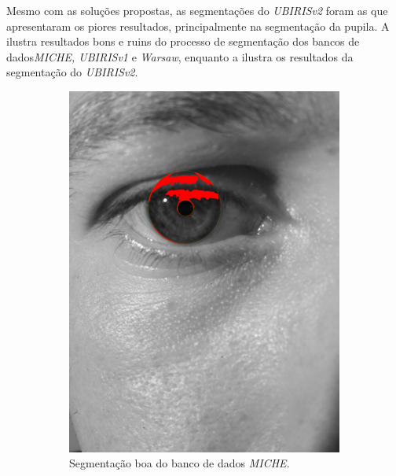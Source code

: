 \par Mesmo com as soluções propostas, as segmentações do \textit{UBIRISv2} foram as que apresentaram os piores resultados, principalmente na segmentação da pupila. A  ilustra resultados bons e ruins do processo de segmentação dos bancos de dados\textit{MICHE, UBIRISv1} e \textit{\acrshort{Warsaw}}, enquanto a  ilustra os resultados da segmentação do \textit{UBIRISv2}.

\begin{figure}[H]
    \centering %
\begin{subfigure}{0.25\textwidth}
  \includegraphics[width=\linewidth]{img/Resultados/miche/miche_seg_boa.jpg}
  \caption{Segmentação boa do banco de dados \textit{MICHE}.}
\end{subfigure}\hfil %
\begin{subfigure}{0.25\textwidth}

\end{subfigure}
\end{figure}
